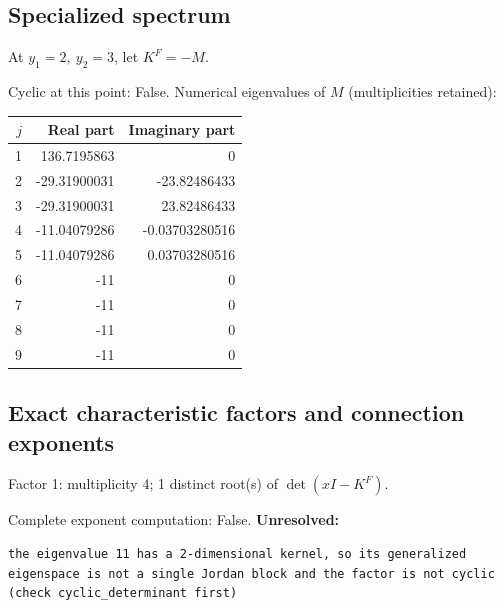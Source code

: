 \documentclass[10pt,a4paper]{article}
\newcommand{\fitmath}[1]{\sbox{\mathbox}{$\displaystyle #1$}\ifdim\wd\mathbox>\linewidth\resizebox{\linewidth}{!}{\usebox{\mathbox}}\else\usebox{\mathbox}\fi}
\begin{document}
\subsection*{Specialized spectrum}
At $y_1=2,\ y_2=3$, let $K^F=-M$.
\begin{center}\fitmath{\Delta=0}\end{center}
Cyclic at this point: False.
Numerical eigenvalues of $M$ (multiplicities retained):
\begin{center}\small\begin{tabular}{rrr}\toprule $j$ & Real part & Imaginary part\\\midrule
1 & 136.7195863 & 0\\
2 & -29.31900031 & -23.82486433\\
3 & -29.31900031 & 23.82486433\\
4 & -11.04079286 & -0.03703280516\\
5 & -11.04079286 & 0.03703280516\\
6 & -11 & 0\\
7 & -11 & 0\\
8 & -11 & 0\\
9 & -11 & 0\\
\bottomrule\end{tabular}\end{center}
\subsection*{Exact characteristic factors and connection exponents}
Factor 1: multiplicity 4; 1 distinct root(s) of $\det(xI-K^F)$.
\begin{center}\fitmath{\begin{aligned}p_{1}(x)&=x - 11\end{aligned}}\end{center}
Complete exponent computation: False.
\textbf{Unresolved:}

\begin{lstlisting}
the eigenvalue 11 has a 2-dimensional kernel, so its generalized eigenspace is not a single Jordan block and the factor is not cyclic (check cyclic_determinant first)
\end{lstlisting}
\end{document}
